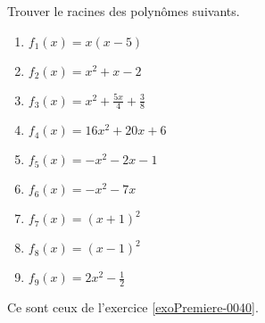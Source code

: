 
\begin{exercice}\label{exoPremiere-0046}
    
    Trouver le racines des polynômes suivants.
    \begin{multicols}{3}
        \begin{enumerate}
            \item
                $f_1(x)=x(x-5)$
            \item
                \( f_2(x)=x^2+x-2\)
            \item
                \( f_3(x)=x^2+\frac{ 5x }{ 4 }+\frac{ 3 }{ 8 }\)
            \item
                \( f_4(x)=16x^2+20x+6\)
            \item
                \( f_5(x)=-x^2-2x-1\)
            \item
                \( f_6(x)=-x^2-7x\)
            \item
                \( f_7(x)=(x+1)^2\)
            \item
                \( f_8(x)=(x-1)^2\)
            \item
                \( f_9(x)=2x^2-\frac{ 1 }{2}\)
        \end{enumerate}
    \end{multicols}

    Ce sont ceux de l'exercice \ref{exoPremiere-0040}.

\end{exercice}
